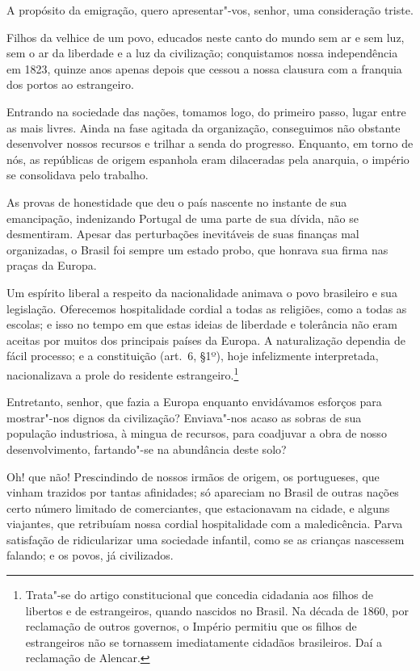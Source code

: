  A propósito da emigração, quero apresentar"-vos, senhor, uma
consideração triste. 

 Filhos da velhice de um povo, educados neste canto do mundo sem ar e
sem luz, sem o ar da liberdade e a luz da civilização; conquistamos
nossa independência em 1823, quinze anos apenas depois que cessou 
a nossa clausura com a franquia dos portos ao estrangeiro.

 Entrando na sociedade das nações, tomamos logo, do primeiro passo,
lugar entre as mais livres. Ainda na fase agitada da organização,
conseguimos não obstante desenvolver nossos recursos e trilhar a senda
do progresso. Enquanto, em torno de nós, as repúblicas de origem
espanhola eram dilaceradas pela anarquia, o império se consolidava pelo trabalho.

 As provas de honestidade que deu o país nascente no instante de sua
emancipação, indenizando Portugal de uma parte de sua dívida, não se
desmentiram. Apesar das perturbações inevitáveis de suas finanças mal
organizadas, o Brasil foi sempre um estado probo, que honrava sua firma
nas praças da Europa. 

 Um espírito liberal a respeito da nacionalidade animava o povo
brasileiro e sua legislação. Oferecemos \mbox{hospitalidade} cordial a todas
as religiões, como a todas as escolas; e isso no tempo em que estas
ideias de liberdade e tolerância não eram aceitas por muitos dos
principais países da Europa. A naturalização dependia de fácil
processo; e a constituição (art.~6, §1º), hoje infelizmente interpretada, 
nacionalizava a prole do residente estrangeiro.\footnote{ Trata"-se do artigo constitucional 
que concedia cidadania aos filhos de libertos e de estrangeiros, quando nascidos no Brasil. 
Na década de 1860, por reclamação de outros governos, o Império permitiu que os filhos de 
estrangeiros não se tornassem imediatamente cidadãos brasileiros. Daí a reclamação de Alencar.}

 Entretanto, senhor, que fazia a Europa enquanto envidávamos esforços
para mostrar"-nos dignos da civilização? Enviava"-nos acaso as sobras
de sua população industriosa, à mingua de recursos, para coadjuvar a
obra de nosso desenvolvimento, fartando"-se na abundância deste solo?

 Oh! que não! Prescindindo de nossos irmãos de origem, os portugueses,
que vinham trazidos por tantas afinidades; só apareciam no Brasil de
outras nações certo número limitado de comerciantes, que estacionavam
na cidade, e alguns viajantes, que retribuíam nossa cordial
hospitalidade com a maledicência. Parva satisfação de ridicularizar uma
sociedade infantil, como se as crianças nascessem falando; e os povos, já civilizados. 

